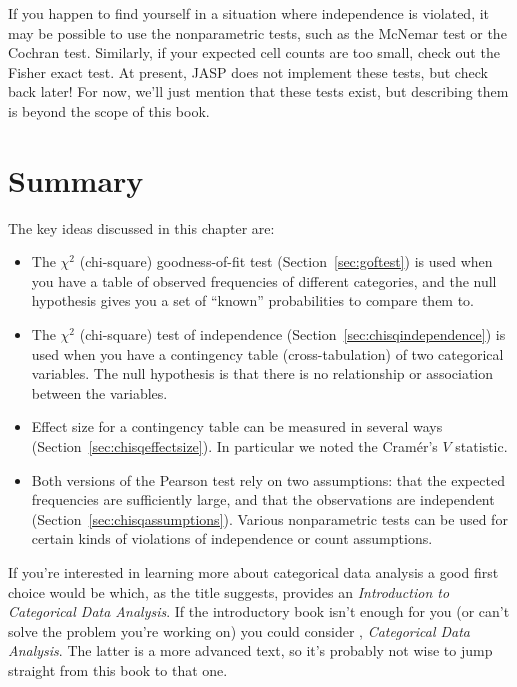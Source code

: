 \noindent
If you happen to find yourself in a situation where independence is violated, it may be possible to use the nonparametric tests, such as the McNemar test or the Cochran test. Similarly, if your expected cell counts are too small, check out the Fisher exact test. At present, JASP does not implement these tests, but check back later!  For now, we'll just mention that these tests exist, but describing them is beyond the scope of this book. 

\section{Summary}

The key ideas discussed in this chapter are:

\begin{itemize}
\item The $\chi^2$ (chi-square) goodness-of-fit test (Section~\ref{sec:goftest}) is used when you have a table of observed frequencies of different categories, and the null hypothesis gives you a set of ``known'' probabilities to compare them to. 
\item The $\chi^2$ (chi-square) test of independence (Section~\ref{sec:chisqindependence}) is used when you have a contingency table (cross-tabulation) of two categorical variables. The null hypothesis is that there is no relationship or association between the variables. 
\item Effect size for a contingency table can be measured in several ways (Section~\ref{sec:chisqeffectsize}). In particular we noted the Cram\'er's $V$ statistic.
\item Both versions of the Pearson test rely on two assumptions: that the expected frequencies are sufficiently large, and that the observations are independent (Section~\ref{sec:chisqassumptions}). Various nonparametric tests can be used for certain kinds of violations of independence or count assumptions. 
\end{itemize}

\noindent
If you're interested in learning more about categorical data analysis a good first choice would be \textcite{Agresti1996} which, as the title suggests, provides an {\it Introduction to Categorical Data Analysis}. If the introductory book isn't enough for you (or can't solve the problem you're working on) you could consider \textcite{Agresti2002}, {\it Categorical Data Analysis}. The latter is a more advanced text, so it's probably not wise to jump straight from this book to that one. 


